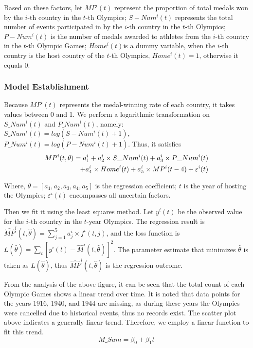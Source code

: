 \documentclass{mcmthesis}
\begin{document}
Based on these factors, let $MP^{i}(t)$ represent the proportion of total medals won by the $i$-th country in the $t$-th Olympics; $S\!-\!Num^{i}(t)$ represents the total number of events participated in by the $i$-th country in the $t$-th Olympics; $P\!-\!Num^{i}(t)$ is the number of medals awarded to athletes from the $i$-th country in the $t$-th Olympic Games; $Home^{i}(t)$is a dummy variable, when the $i$-th country is the host country of the $t$-th Olympics, $Home^{i}(t)=1$, otherwise it equals 0.

\subsubsection{Model Establishment}
Because $MP^{i}(t)$ represents the medal-winning rate of each country, it takes values between 0 and 1. We perform a logarithmic transformation on $S\_Num^{i}(t)$ and $P\_Num^{i}(t)$, namely: $S\_Num^{i}(t) = log(S\!-\!Num^{i}(t) + 1)$, $P\_Num^{i}(t) = log(P\!-\!Num^{i}(t) + 1)$.
Thus, it satisfies
\begin{align} \label{eq1}
\notag
MP^{i}(t, \theta) = a_{1}^{i} + a_{2}^{i} \times S\_Num^{i}(t) + a_{3}^{i} \times P\_Num^i(t) \\ 
+ a_{4}^{i} \times Home^{i}(t) + a_{5}^{i} \times MP^{i}(t - 4) + \varepsilon^{i}(t)
\end{align}

Where, $\theta = [a_{1}, a_{2}, a_{3}, a_{4}, a_{5}]$ is the regression coefficient; $t$ is the year of hosting the Olympics; $\varepsilon ^{i}(t)$ encompasses all uncertain factors.

Then we fit it using the least squares method. Let $y^{i}(t)$ be the observed value for the $i$-th country in the $t$-year Olympics. The regression result is $\hat{MP}^{i}(t, \hat{\theta })=\sum_{j=1}^{5}a_{j}^{i}\times f^{i}(t, j)$, and the loss function is $L(\hat{\theta }) = \sum_{t}[y^{i}(t)-\hat{M}^{i}(t, \hat{\theta})]^2$. The parameter estimate that minimizes 
$\hat{\theta }$ is taken as $L(\hat{\theta })$, thus $\hat{MP}^{i}(t, \hat{\theta })$ is the regression outcome.

From the analysis of the above figure, it can be seen that the total count of each Olympic Games shows a linear trend over time. It is noted that data points for the years 1916, 1940, and 1944 are missing, as during these years the Olympics were cancelled due to historical events, thus no records exist. The scatter plot above indicates a generally linear trend. Therefore, we employ a linear function to fit this trend.
\begin{equation}
M\_Sum = \beta_{0} + \beta_{1}t
\end{equation}
\end{document}
